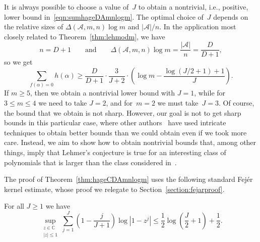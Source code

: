 \begin{remark}
It is always possible to choose a value of~$J$ to obtain a nontrivial,
i.e., positive, lower bound in~\eqref{eqn:sumhageDAmnlogm}. The
optimal choice of~$J$ depends on the relative sizes of
${\Delta}({{\mathcal A}},m,n)\log m$ and $|{{\mathcal A}}|/n$. In the application most closely related
to Theorem~\ref{thm:lehmodm}, we have
\[
  n=D+1\qquad\text{and}\qquad
  {\Delta}({{\mathcal A}},m,n)\log m = \frac{|{{\mathcal A}}|}{n} = \frac{D}{D+1},
\]
so we get
\[
  \sum_{f({\alpha})=0} h({\alpha}) \ge \frac{D}{D+1}\cdot\frac{3}{J+2}
    \cdot\left(\log m - \frac{\log(J/2+1)+1}{J}\right).
\]
If $m\ge5$, then we obtain a nontrivial lower bound with $J=1$, while
for~$3\le m\le 4$ we need to take $J=2$, and for~$m=2$ we must
take~$J=3$.  Of course, the bound that we obtain is not sharp. 
However, our goal is not to get sharp bounds in this particular case,
where other authors~\cite{BoDoMo,BoHaMo,DuMo,GaIsMoPiWi} have used
intricate techniques to obtain better bounds than we could obtain even
if we took more care. Instead, we aim to show how to obtain nontrivial
bounds that, among other things, imply that Lehmer's conjecture is
true for an interesting class of polynomials that is larger than the
class considered in~\cite{BoDoMo,BoHaMo,DuMo,GaIsMoPiWi}.
\end{remark}

The proof of Theorem~\ref{thm:hageCDAmnlogm}  uses the following
standard Fej\'er kernel estimate, whose proof we relegate to 
Section~\ref{section:fejarproof}.

\begin{proposition}
\label{prop:fejarestimate}
For all $J\ge1$ we have
\[
  \sup_{\substack{z\in{\mathbb{C}}\\ |z|\le 1\\}} 
    \sum_{j=1}^J \left(1-\frac{j}{J+1}\right)\log|1-z^j|
  \le \frac{1}{2}\log\left(\frac{J}{2}+1\right)+\frac{1}{2}.
\]
\end{proposition}

